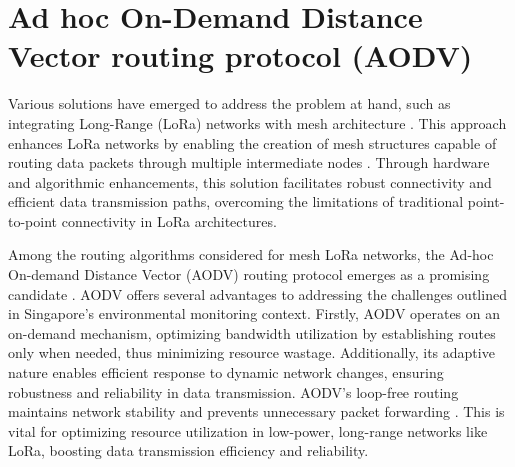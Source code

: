 


\section{Ad hoc On-Demand Distance Vector routing protocol (AODV)}\label{sec:lr_aodv}

Various solutions have emerged to address the problem at hand, such as integrating Long-Range (LoRa) networks with mesh architecture \cite{8326735, s21134314}. This approach enhances LoRa networks by enabling the creation of mesh structures capable of routing data packets through multiple intermediate nodes \cite{8324573}. Through hardware and algorithmic enhancements, this solution facilitates robust connectivity and efficient data transmission paths, overcoming the limitations of traditional point-to-point connectivity in LoRa architectures.

Among the routing algorithms considered for mesh LoRa networks, the Ad-hoc On-demand Distance Vector (AODV) routing protocol emerges as a promising candidate \cite{BELDINGROYER2003125}. AODV offers several advantages to addressing the challenges outlined in Singapore's environmental monitoring context. Firstly, AODV operates on an on-demand mechanism, optimizing bandwidth utilization by establishing routes only when needed, thus minimizing resource wastage. Additionally, its adaptive nature enables efficient response to dynamic network changes, ensuring robustness and reliability in data transmission. AODV's loop-free routing maintains network stability and prevents unnecessary packet forwarding \cite{10.1145/313451.313538}. This is vital for optimizing resource utilization in low-power, long-range networks like LoRa, boosting data transmission efficiency and reliability.

